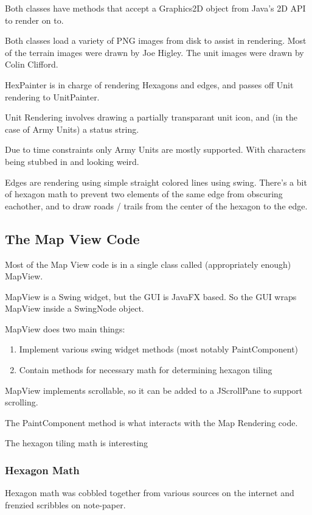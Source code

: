 \documentclass[12pt,a4paper]{article}
\begin{document}
Both classes have methods that accept a Graphics2D object from Java's 2D API
to render on to.

Both classes load a variety of PNG images from disk to assist in rendering.
Most of the terrain images were drawn by Joe Higley.
The unit images were drawn by Colin Clifford.

HexPainter is in charge of rendering Hexagons and edges,
and passes off Unit rendering to UnitPainter.

Unit Rendering involves drawing a partially transparant unit icon,
and (in the case of Army Units) a status string.

Due to time constraints only Army Units are mostly supported. With characters
being stubbed in and looking weird.

Edges are rendering using simple straight colored lines using swing.
There's a bit of hexagon math to prevent two elements of the same edge
from obscuring eachother, and to draw roads / trails from the center of the
hexagon to the edge.


\subsection{The Map View Code}
Most of the Map View code is in a single class called (appropriately enough)
MapView.

MapView is a Swing widget, but the GUI is JavaFX based. So the GUI wraps
MapView inside a SwingNode object.

MapView does two main things:
\begin{enumerate}
\item{Implement various swing widget methods (most notably PaintComponent)}
\item{Contain methods for necessary math for determining hexagon tiling}
\end{enumerate}

MapView implements scrollable, so it can be added to a JScrollPane to support
scrolling.

The PaintComponent method is what interacts with the Map Rendering code.

The hexagon tiling math is interesting

\subsubsection{Hexagon Math}
Hexagon math was cobbled together from various sources on the internet and
frenzied scribbles on note-paper. 
\end{document}
